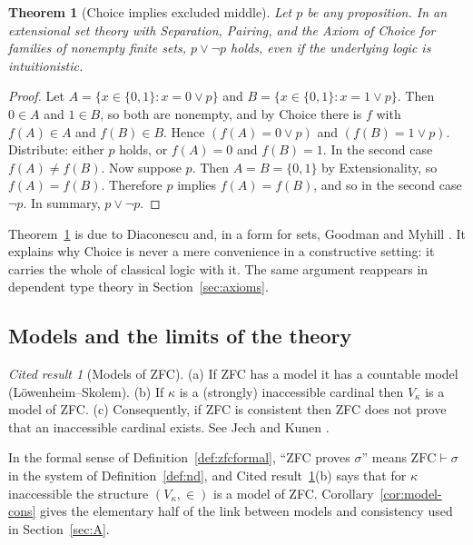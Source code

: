 \documentclass[11pt]{article}
\theoremstyle{definition}
\theoremstyle{plain}
\newtheorem{theorem}[definition]{Theorem}
\theoremstyle{remark}
\newtheorem{cited}[definition]{Cited result}
\begin{document}
\begin{theorem}[Choice implies excluded middle]\label{thm:diaconescu}
Let $p$ be any proposition. In an extensional set theory with Separation, Pairing, and the Axiom of Choice for families of nonempty finite sets, $p\vee\neg p$ holds, even if the underlying logic is intuitionistic.
\end{theorem}
\begin{proof}
Let $A=\{x\in\{0,1\}: x=0\vee p\}$ and $B=\{x\in\{0,1\}: x=1\vee p\}$. Then $0\in A$ and $1\in B$, so both are nonempty, and by Choice there is $f$ with $f(A)\in A$ and $f(B)\in B$. Hence $(f(A)=0\vee p)$ and $(f(B)=1\vee p)$. Distribute: either $p$ holds, or $f(A)=0$ and $f(B)=1$. In the second case $f(A)\neq f(B)$. Now suppose $p$. Then $A=B=\{0,1\}$ by Extensionality, so $f(A)=f(B)$. Therefore $p$ implies $f(A)=f(B)$, and so in the second case $\neg p$. In summary, $p\vee\neg p$.
\end{proof}

Theorem~\ref{thm:diaconescu} is due to Diaconescu \cite{Diaconescu75} and, in a form for sets, Goodman and Myhill \cite{GoodmanMyhill78}. It explains why Choice is never a mere convenience in a constructive setting: it carries the whole of classical logic with it. The same argument reappears in dependent type theory in Section~\ref{sec:axioms}.

\subsection{Models and the limits of the theory}

\begin{cited}[Models of ZFC]\label{cit:models}
(a) If ZFC has a model it has a countable model (L\"owenheim--Skolem). (b) If $\kappa$ is a (strongly) inaccessible cardinal then $V_\kappa$ is a model of ZFC. (c) Consequently, if ZFC is consistent then ZFC does not prove that an inaccessible cardinal exists. See Jech \cite[Ch.~12 and Ch.~13]{Jech03} and Kunen \cite[Ch.~IV]{Kunen80}.
\end{cited}

In the formal sense of Definition~\ref{def:zfcformal}, ``ZFC proves $\sigma$'' means $\mathrm{ZFC}\vdash\sigma$ in the system of Definition~\ref{def:nd}, and Cited result~\ref{cit:models}(b) says that for $\kappa$ inaccessible the structure $(V_\kappa,\in)$ is a model of ZFC. Corollary~\ref{cor:model-cons} gives the elementary half of the link between models and consistency used in Section~\ref{sec:A}.
\end{document}
